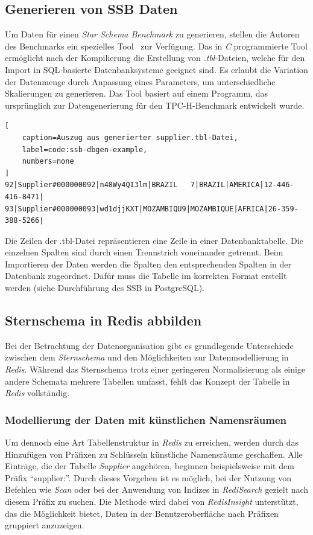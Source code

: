 \subsection{Generieren von SSB Daten}
Um Daten für einen \emph{Star Schema Benchmark} zu generieren, stellen die Autoren des Benchmarks ein spezielles Tool~\cite{phillips_electrumssb-dbgen_2023} zur Verfügung.
Das in \emph{C} programmierte Tool ermöglicht nach der Kompilierung die Erstellung von \emph{.tbl}-Dateien, welche für den Import in SQL-basierte Datenbanksysteme geeignet sind.
Es erlaubt die Variation der Datenmenge durch Anpassung eines Parameters, um unterschiedliche Skalierungen zu generieren. %
Das Tool basiert auf einem Programm, das ursprünglich zur Datengenerierung für den TPC-H-Benchmark entwickelt wurde.
\begin{lstlisting}[
    caption=Auszug aus generierter supplier.tbl-Datei,
    label=code:ssb-dbgen-example,
    numbers=none
]
92|Supplier#000000092|n48Wy4QI3lm|BRAZIL   7|BRAZIL|AMERICA|12-446-416-8471|
93|Supplier#000000093|wd1djjKXT|MOZAMBIQU9|MOZAMBIQUE|AFRICA|26-359-388-5266|
\end{lstlisting}
Die Zeilen der .tbl-Datei repräsentieren eine Zeile in einer Datenbanktabelle. Die einzelnen Spalten sind durch einen Trennstrich voneinander getrennt.
Beim Importieren der Daten werden die Spalten den entsprechenden Spalten in der Datenbank zugeordnet. Dafür muss die Tabelle im korrekten Format erstellt werden (siehe Durchführung des SSB in PostgreSQL). %

\subsection{Sternschema in Redis abbilden}
Bei der Betrachtung der Datenorganisation gibt es grundlegende Unterschiede zwischen dem \emph{Sternschema} und den Möglichkeiten zur Datenmodellierung in \emph{Redis}. Während das Sternschema trotz einer geringeren Normalisierung als einige andere Schemata mehrere Tabellen umfasst, fehlt das Konzept der Tabelle in \emph{Redis} vollständig.

\subsubsection{Modellierung der Daten mit künstlichen Namensräumen}
Um dennoch eine Art Tabellenstruktur in \emph{Redis} zu erreichen, werden durch das Hinzufügen von Präfixen zu Schlüsseln künstliche Namensräume geschaffen. Alle Einträge, die der Tabelle \emph{Supplier} angehören, beginnen beispielsweise mit dem Präfix \enquote{supplier:}. Durch dieses Vorgehen ist es möglich, bei der Nutzung von Befehlen wie \emph{Scan} oder bei der Anwendung von Indizes in \emph{RediSearch} gezielt nach diesem Präfix zu suchen. Die Methode wird dabei von \emph{RedisInsight} unterstützt, das die Möglichkeit bietet, Daten in der Benutzeroberfläche nach Präfixen gruppiert anzuzeigen. %

